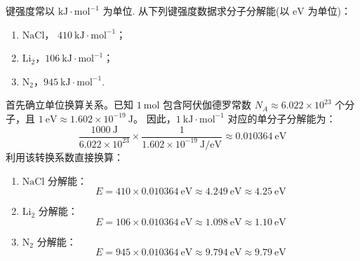 \begin{exercise}\label{ex:26.3}
键强度常以 $\mathrm{kJ \cdot mol^{-1}}$ 为单位. 从下列键强度数据求分子分解能(以 $\mathrm{eV}$ 为单位)：
\begin{enumerate}
  \item[(a)] $\mathrm{NaCl}$， $410 \ \mathrm{kJ \cdot mol^{-1}}$；
  \item[(b)] $\mathrm{Li}_2$，$106 \ \mathrm{kJ \cdot mol^{-1}}$；
  \item[(c)] $\mathrm{N}_2$，$945 \ \mathrm{kJ \cdot mol^{-1}}$.
\end{enumerate}
\end{exercise}
\begin{solution}
首先确立单位换算关系。已知 $1 \ \mathrm{mol}$ 包含阿伏伽德罗常数 $N_A \approx 6.022 \times 10^{23}$ 个分子，且 $1 \ \mathrm{eV} \approx 1.602 \times 10^{-19} \ \mathrm{J}$。
因此，$1 \ \mathrm{kJ \cdot mol^{-1}}$ 对应的单分子分解能为：
$$ \frac{1000 \ \mathrm{J}}{6.022 \times 10^{23}} \times \frac{1}{1.602 \times 10^{-19} \ \mathrm{J/eV}} \approx 0.010364 \ \mathrm{eV} $$
利用该转换系数直接换算：

\begin{enumerate}
    \item[(a)] $\mathrm{NaCl}$ 分解能：
    $$ E = 410 \times 0.010364 \ \mathrm{eV} \approx 4.249 \ \mathrm{eV} \approx 4.25 \ \mathrm{eV} $$

    \item[(b)] $\mathrm{Li}_2$ 分解能：
    $$ E = 106 \times 0.010364 \ \mathrm{eV} \approx 1.098 \ \mathrm{eV} \approx 1.10 \ \mathrm{eV} $$

    \item[(c)] $\mathrm{N}_2$ 分解能：
    $$ E = 945 \times 0.010364 \ \mathrm{eV} \approx 9.794 \ \mathrm{eV} \approx 9.79 \ \mathrm{eV} $$
\end{enumerate}
\end{solution}

